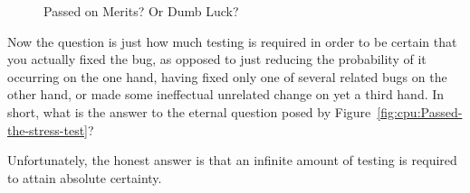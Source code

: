 \begin{figure}[tb]
\centering
{}
\caption{Passed on Merits?  Or Dumb Luck?}
\end{figure}

Now the question is just how much testing is required in order to be
certain that
you actually fixed the bug, as opposed to just reducing the probability
of it occurring on the one hand, having fixed only one of several
related bugs on the other hand, or made some ineffectual unrelated
change on yet a third hand.
In short, what is the answer to the eternal question posed by
Figure~\ref{fig:cpu:Passed-the-stress-test}?

Unfortunately, the honest answer is that an infinite amount of testing
is required to attain absolute certainty.

